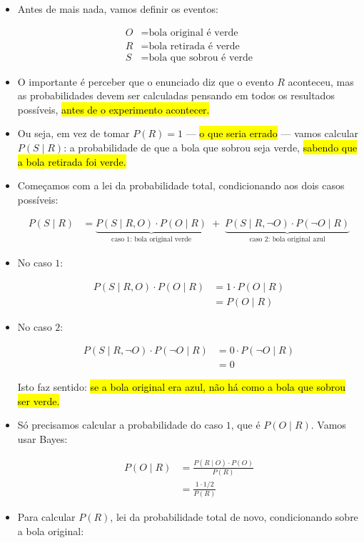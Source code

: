 \documentclass[
  11pt]{report}
\begin{document}
\begin{itemize}
\item
  Antes de mais nada, vamos definir os eventos:

  \[
  \begin{aligned}
    O &= \text{bola original é verde} \\
    R &= \text{bola retirada é verde} \\
    S &= \text{bola que sobrou é verde}
  \end{aligned}
  \]
\item
  O importante é perceber que o enunciado diz que o evento $R$ aconteceu, mas as probabilidades devem ser calculadas pensando em todos os resultados possíveis, {\hl{antes de o experimento acontecer.}}
\item
  Ou seja, em vez de tomar $P(R) = 1$ --- {\hl{o que seria errado}} --- vamos calcular $P(S \mid R)$: a probabilidade de que a bola que sobrou seja verde, {\hl{sabendo que a bola retirada foi verde.}}
\item
  Começamos com a lei da probabilidade total, condicionando aos dois casos possíveis:

  \[
  \begin{aligned}
  P(S \mid R) &= 
  \underbrace{P(S \mid R, O) \cdot P(O \mid R)}_{\text{caso 1: bola original verde}} 
  \;+\;
  \underbrace{P(S \mid R, \neg O) \cdot P(\neg O \mid R)}_{\text{caso 2: bola original azul}}  
  \end{aligned}
  \]
\item
  No caso $1$:

  \[
  \begin{aligned}
  P(S \mid R, O) \cdot P(O \mid R) 
  &= 1 \cdot P(O \mid R) \\
  &= P(O \mid R)
  \end{aligned}
  \]
\item
  No caso $2$:

  \[
  \begin{aligned}
  P(S \mid R, \neg O) \cdot P(\neg O \mid R) 
  &= 0 \cdot P(\neg O \mid R) \\
  &= 0
  \end{aligned} 
  \]

  Isto faz sentido: {\hl{se a bola original era azul, não há como a bola que sobrou ser verde.}}
\item
  Só precisamos calcular a probabilidade do caso $1$, que é $P(O \mid R)$. Vamos usar Bayes:

  \[
  \begin{aligned}
  P(O \mid R) 
  &= \frac{P(R \mid O) \cdot P(O)}{P(R)} \\
  &= \frac{1 \cdot 1/2}{P(R)}
  \end{aligned}
  \]
\item
  Para calcular $P(R)$, lei da probabilidade total de novo, condicionando sobre a bola original:


\end{itemize}
\end{document}
